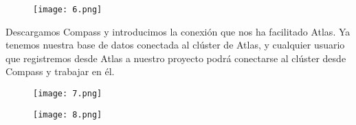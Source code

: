 \begin{figure}[!h]
  \centering
    \texttt{[image: 6.png]}
\end{figure}

\pagebreak
Descargamos Compass y introducimos la conexión que nos ha facilitado Atlas. Ya tenemos nuestra base de datos conectada al clúster de Atlas, y cualquier usuario que registremos desde Atlas a nuestro proyecto podrá conectarse al clúster desde Compass y trabajar en él.

\begin{figure}[!h]
  \centering
    \texttt{[image: 7.png]}
\end{figure}

\begin{figure}[!h]
  \centering
    \texttt{[image: 8.png]}
\end{figure}

